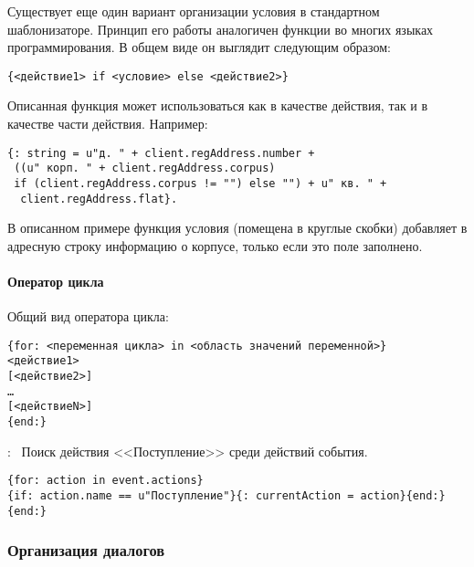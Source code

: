 Существует еще один вариант организации условия в стандартном шаблонизаторе. Принцип его работы аналогичен функции  во многих языках программирования. В общем виде он выглядит следующим образом:

\verb|{<действие1> if <условие> else <действие2>}|

Описанная функция может использоваться как в качестве действия, так и в качестве части действия. Например: \begin{verbatim}
{: string = u"д. " + client.regAddress.number +
 ((u" корп. " + client.regAddress.corpus) 
 if (client.regAddress.corpus != "") else "") + u" кв. " +
  client.regAddress.flat}.
\end{verbatim} 
В описанном примере функция условия (помещена в круглые скобки) добавляет в адресную строку информацию о корпусе, только если это поле заполнено.

\paragraph{Оператор цикла} 

Общий вид оператора цикла:
\begin{verbatim}
{for: <переменная цикла> in <область значений переменной>}
<действие1>
[<действие2>]
…
[<действиеN>]
{end:}
\end{verbatim}

: ~Поиск действия <<Поступление>> среди действий события.
\begin{verbatim}
{for: action in event.actions}
{if: action.name == u"Поступление"}{: currentAction = action}{end:}
{end:}
\end{verbatim}

\subsubsection{Организация диалогов}

